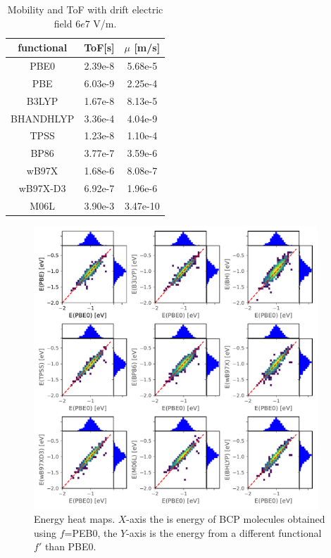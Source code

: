 \documentclass[letterpaper,12pt]{article}
\begin{document}
\begin{table}[h]
    \centering
    \begin{tabular}{c c c  }
    \hline
        functional & ToF[s] & $\mu$ [m/s]   \\ 
        \hline
        PBE0 & 2.39e-8 & 5.68e-5 \\
        PBE & 6.03e-9 & 2.25e-4  \\ 
        B3LYP & 1.67e-8 & 8.13e-5 \\
        BHANDHLYP & 3.36e-4 & 4.04e-9   \\
        TPSS & 1.23e-8 & 1.10e-4   \\
        BP86 & 3.77e-7 & 3.59e-6   \\
        wB97X & 1.68e-6 & 8.08e-7  \\
        wB97X-D3 & 6.92e-7 & 1.96e-6  \\
        M06L & 3.90e-3 & 3.47e-10  \\
    \hline
    \end{tabular}
    \caption{ Mobility and ToF with drift electric field $6e7$ V/m. }
    \label{tab:para2}
\end{table}

\begin{figure}
    \centering
    \includegraphics[width=0.95\textwidth]{figs/scatterE_all.pdf}
    \caption{Energy heat maps. $X$-axis the is energy of BCP molecules obtained using $f$=PEB0, the $Y$-axis is the energy from a different functional $f'$ than PBE0.}
    \label{fig:scatterE}
\end{figure}
\end{document}
